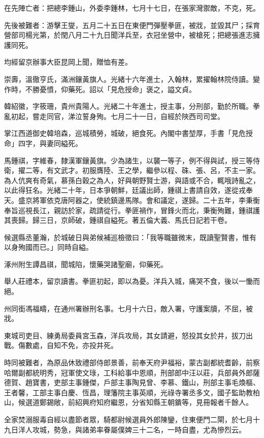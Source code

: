 \begin{pinyinscope}
在先陣亡者：把總李鍾山，外委李鍾林，七月十七日，在張家灣禦敵，不克，死。

先後被難者：游擊王燮，五月二十五日在東便門彈壓拳匪，被戕，並毀其尸；採育營部司楊光第，於閏八月二十九日聞洋兵至，衣冠坐營中，被槍死；把總張進志擁護同死。

均經留京辦事大臣昆岡上聞，贈恤有差。

崇壽，溫徹亨氏，滿洲鑲黃旗人。光緒十六年進士，入翰林，累擢翰林院侍讀。變作時，不勝憂憤，仰藥死。詔以「見危授命」褒之，謚文貞。

韓紹徽，字筱珊，貴州貴陽人。光緒二十年進士，授主事，分刑部，勤於所職。拳亂初起，嘗走同官，涕泣誓身殉。七月二十一日，自經於陜西司司堂。

掌江西道御史韓培森，巡城積勞，城破，絕食死。內閣中書堃厚，手書「見危授命」四字，與妻同縊死。

馬鍾祺，字維春，隸漢軍鑲黃旗。少為諸生，以襲一等子，例不得與試，授三等侍衛，擢二等，有文武才。初服膺陸、王之學，繼參以程、硃、張、呂，不主一家。為人伉爽有奇氣，慕孫白穀之為人，好與朝野賢士游，與語或不合，輒哦詩亂之，以此得狂名。光緒二十年，日本爭朝鮮，廷議出師，鍾祺上書請自效，遂從戎奉天。盛京將軍依克唐阿器之，使統鎮邊馬隊。會和議定，遂歸。二十五年，李秉衡奉旨巡視長江，親訪於家，疏請從行。拳匪禍作，冒鋒火而北，秉衡殉難，鍾祺護其喪歸。歸三日，京師破，鍾祺自縊死。著五倫大義、馬氏日記若干卷。

候選縣丞董瀚，於城破日與弟候補巡檢徵曰：「我等職雖微末，既讀聖賢書，惟有以身殉國而已。」同時自縊。

涿州附生譚昌祺，聞城陷，懷藥哭諸聖廟，仰藥死。

舉人莊禮本，留京讀書。拳匪初起，即以為憂。洋兵入城，痛哭不食，後以一慟而絕。

州同銜馮福疇，在通州署辦刑名事。七月十六日，敵入署，守護案牘，不屈，被戕。

東城司吏目、練勇局委員宮玉森，洋兵攻局，其女請避，怒投其女於井，拔刀出戰。傷數處，自知不免，亦投井死。

時同被難者，為原品休致禮部侍郎景善，前奉天府尹福裕，蒙古副都統耆齡，前察哈爾副都統明秀，冠軍使文琭，工科給事中恩順，刑部郎中汪以莊，兵部員外郎薩德賀、趙寶書，吏部主事鍾傑，戶部主事陶見曾、李慕、鐵山，刑部主事毛煥樞、王者馨，工部主事白慶、恆昌，理籓院主事英順，光祿寺署丞多文，國子監助教柏山，候選道鄭錫敞，前紹興府知府繼恩，分省知縣王朝鐀等，見冊報者千餘人。

全家焚溺服毒自經以盡節者眾，騎都尉候選員外郎陳鑾，住東便門二閘，於七月十九日洋人攻城，勢急，與諸弟率眷屬僕婢三十二名，一時自盡，尤為慘烈云。


\end{pinyinscope}
